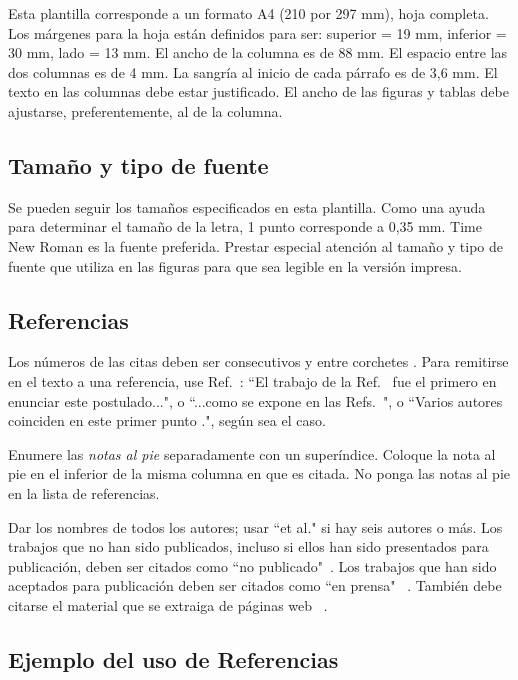 \documentclass[a4paper, 10pt, conference]{ieeeconf}      %
\begin{document}
Esta plantilla corresponde a un formato A4 (210 por 297 mm), hoja completa. Los m\'argenes para la hoja est\'an definidos para ser: superior = 19 mm, inferior = 30 mm, lado = 13 mm. El ancho de la columna es de 88 mm.  El espacio entre las dos columnas es de 4 mm.  La sangr\'ia al inicio de cada p\'arrafo es de 3,6 mm.
El texto en las columnas debe estar justificado. El ancho de las figuras y tablas debe ajustarse, preferentemente, al de la columna.

\subsection{Tama\~no y tipo de fuente}
Se pueden seguir los tama\~nos especificados en esta plantilla. Como una ayuda para determinar el tama\~no de la letra, 1 punto corresponde a 0,35 mm.  Time New Roman es la fuente preferida. Prestar especial atenci\'on al tama\~no y tipo de fuente que utiliza en las figuras para que sea legible en la versión impresa. 

\subsection{Referencias}

Los n\'umeros de las citas deben ser consecutivos y entre corchetes \cite{c1}. Para remitirse en el texto a una referencia, use Ref.~\cite{c3}: ``El trabajo de la Ref.~\cite{c3} fue el primero en enunciar este postulado...", o ``...como se expone en las Refs.~\cite{c1,c5}", o ``Varios autores coinciden en este primer punto \cite{c1,c2,c3,c4}.", seg\'un sea el caso. 

Enumere las {\it notas al pie} separadamente con un super\'indice. Coloque la nota al pie en el inferior de la misma columna en que es citada.  No ponga las notas al pie en la lista de referencias.  

Dar los nombres de todos los autores; usar ``et al." si hay seis autores o m\'as.  Los trabajos que no han sido publicados, incluso si ellos han sido presentados para publicaci\'on, deben ser citados como ``no publicado"~\cite{c4}.  Los trabajos que han sido aceptados para publicaci\'on deben ser citados como ``en prensa" ~\cite{c5}.  Tambi\'en debe citarse el material que se extraiga de p\'aginas web ~\cite{c8}.

\subsection{Ejemplo del uso de Referencias}
\end{document}
